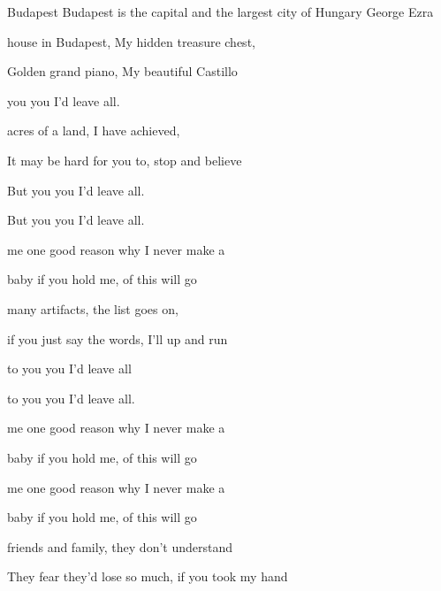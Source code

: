 \begin{SBSong}{Budapest}
  {Budapest is the capital and the largest city of Hungary}
  {George Ezra}
  \begin{SBVerse}
     house in Budapest, My hidden treasure chest,
    
    Golden grand piano, My beautiful Castillo
    
     you you I'd leave  all.
    
     acres of a land, I have achieved,
    
    It may be hard for you to, stop and believe
    
    But  you you I'd leave  all.
    
    But  you you I'd leave  all.
  \end{SBVerse}  
  \begin{SBChorus}
     me one good reason why I  never make a 
    
     baby if you hold me,  of this will go 
  \end{SBChorus}
  \begin{SBVerse}
     many artifacts, the list goes on, 

    if you just say the words, I'll up and run
    
     to you you I'd leave  all
    
     to you you I'd leave  all.
  \end{SBVerse}
  \begin{SBChorus}
     me one good reason why I   never make a 
    
     baby if you hold me,  of this will go 
    
     me one good reason why I  never make a 
    
     baby if you hold me,  of this will go 

  \end{SBChorus}
  \begin{SBVerse}  
      friends and family, they don't understand
     
     They fear they'd lose so much, if you took my hand
     

\end{SBVerse}
\end{SBSong}

